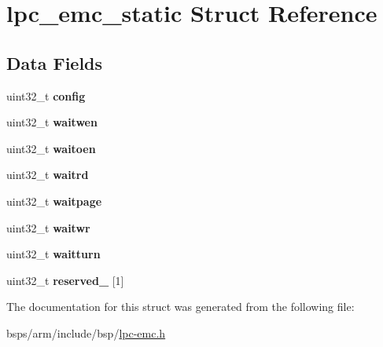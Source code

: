 \hypertarget{structlpc__emc__static}{}\section{lpc\+\_\+emc\+\_\+static Struct Reference}
\label{structlpc__emc__static}
\subsection*{Data Fields}
\begin{DoxyCompactItemize}
\item 
\mbox{\label{structlpc__emc__static_ab7ff61fbc417c138ef3d844d4f70c73c}} 
uint32\+\_\+t {\bfseries config}
\item 
\mbox{\label{structlpc__emc__static_a147476a64926c011f47aa38ea4a52977}} 
uint32\+\_\+t {\bfseries waitwen}
\item 
\mbox{\label{structlpc__emc__static_a402aa70fdeca6ea12034fc5e9ef4e258}} 
uint32\+\_\+t {\bfseries waitoen}
\item 
\mbox{\label{structlpc__emc__static_a884316a2169f09e9880cc5e1dec9a541}} 
uint32\+\_\+t {\bfseries waitrd}
\item 
\mbox{\label{structlpc__emc__static_a414f9331ab4f2fb3f150ea576c60f2fa}} 
uint32\+\_\+t {\bfseries waitpage}
\item 
\mbox{\label{structlpc__emc__static_a3826aa38185da5b58f419831b9d295b8}} 
uint32\+\_\+t {\bfseries waitwr}
\item 
\mbox{\label{structlpc__emc__static_ac96a52bf29188bf9850aaac0e3bce117}} 
uint32\+\_\+t {\bfseries waitturn}
\item 
\mbox{\label{structlpc__emc__static_a3e267046579d1da7e5b303cdab7af78c}} 
uint32\+\_\+t {\bfseries reserved\+\_} \mbox{[}1\mbox{]}
\end{DoxyCompactItemize}


The documentation for this struct was generated from the following file\+:\begin{DoxyCompactItemize}
\item 
bsps/arm/include/bsp/\mbox{\hyperlink{lpc-emc_8h}{lpc-\/emc.\+h}}\end{DoxyCompactItemize}
